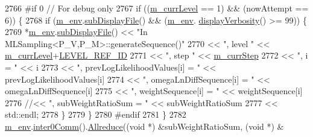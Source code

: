 \begin{DoxyCode}
2766 \textcolor{preprocessor}{#if 0 // For debug only}
2767 \textcolor{preprocessor}{}          \textcolor{keywordflow}{if} ((\hyperlink{class_q_u_e_s_o_1_1_m_l_sampling_af9416874c856e50f3b35270e801f17e4}{m\_currLevel} == 1) && (nowAttempt == 6))  \{
2768             \textcolor{keywordflow}{if} (\hyperlink{class_q_u_e_s_o_1_1_m_l_sampling_a13f1ca4fe9f94822fe572a743eaced1d}{m\_env}.\hyperlink{class_q_u_e_s_o_1_1_base_environment_a8a0064746ae8dddfece4229b9ad374d6}{subDisplayFile}() && (\hyperlink{class_q_u_e_s_o_1_1_m_l_sampling_a13f1ca4fe9f94822fe572a743eaced1d}{m\_env}.
      \hyperlink{class_q_u_e_s_o_1_1_base_environment_a1fe5f244fc0316a0ab3e37463f108b96}{displayVerbosity}() >= 99)) \{
2769               *\hyperlink{class_q_u_e_s_o_1_1_m_l_sampling_a13f1ca4fe9f94822fe572a743eaced1d}{m\_env}.\hyperlink{class_q_u_e_s_o_1_1_base_environment_a8a0064746ae8dddfece4229b9ad374d6}{subDisplayFile}() << \textcolor{stringliteral}{"In MLSampling<P\_V,P\_M>::generateSequence()"}
2770                                       << \textcolor{stringliteral}{", level "}                        << 
      \hyperlink{class_q_u_e_s_o_1_1_m_l_sampling_af9416874c856e50f3b35270e801f17e4}{m\_currLevel}+\hyperlink{_m_l_sampling_level_options_8h_a68d15eaf394d210effcf584b938206d3}{LEVEL\_REF\_ID}
2771                                       << \textcolor{stringliteral}{", step "}                         << 
      \hyperlink{class_q_u_e_s_o_1_1_m_l_sampling_a1b1f8ccb4823bdfa26ec652f0807c63e}{m\_currStep}
2772                                       << \textcolor{stringliteral}{", i = "}                          << i
2773                                       << \textcolor{stringliteral}{", prevLogLikelihoodValues[i] = "} << prevLogLikelihoodValues[i]
2774                                       << \textcolor{stringliteral}{", omegaLnDiffSequence[i] = "}     << omegaLnDiffSequence[i]
2775                                       << \textcolor{stringliteral}{", weightSequence[i] = "}          << weightSequence[i]
2776     \textcolor{comment}{//<< ", subWeightRatioSum = "          << subWeightRatioSum}
2777                                       << std::endl;
2778             \}
2779           \}
2780 \textcolor{preprocessor}{#endif}
2781 \textcolor{preprocessor}{}        \}
2782         \hyperlink{class_q_u_e_s_o_1_1_m_l_sampling_a13f1ca4fe9f94822fe572a743eaced1d}{m\_env}.\hyperlink{class_q_u_e_s_o_1_1_base_environment_a689e4d140c74d495d97eb498714a4b82}{inter0Comm}().\hyperlink{class_q_u_e_s_o_1_1_mpi_comm_a72e137e60ef8060efb1ee5fc874fa4b8}{Allreduce}((\textcolor{keywordtype}{void} *) &subWeightRatioSum, (\textcolor{keywordtype}{void} *) &

\end{DoxyCode}
